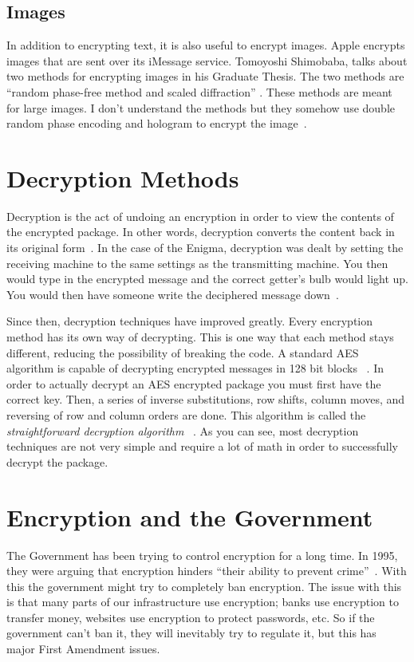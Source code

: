\documentclass[12pt,a4paper,titlepage]{article}
\begin{document}
\subsection{Images}
In addition to encrypting text, it is also useful to encrypt images. Apple 
encrypts images that are sent over its iMessage service. Tomoyoshi Shimobaba, 
talks about two methods for encrypting images in his Graduate Thesis.  The two 
methods are ``random phase-free method and scaled diffraction'' 
\cite{shimobaba2015optical}. These methods are meant for large images. I don't 
understand the methods but they somehow use double random phase encoding and 
hologram to encrypt the image~\cite{shimobaba2015optical}.

\section{Decryption Methods}
Decryption is the act of undoing an encryption in order to view the contents of
the encrypted package. In other words, decryption converts the content back in
its original form~\cite{deshpande2009fpga}. In the case of the Enigma,
decryption was dealt by setting the receiving machine to the same settings as
the transmitting machine. You then would type in the encrypted message and the
correct getter's bulb would light up. You would then have someone write the
deciphered message down~\cite{wilcox2006solving}.

Since then, decryption techniques have improved greatly. Every encryption
method has its own way of decrypting. This is one way that each method stays
different, reducing the possibility of breaking the code. A standard AES
algorithm is capable of decrypting encrypted messages in 128 bit blocks
~\cite{deshpande2009fpga}. In order to actually decrypt an AES encrypted package
you must first have the correct key. Then, a series of inverse substitutions,
row shifts, column moves, and reversing of row and column orders are done. This
algorithm is called the \emph{straightforward decryption algorithm}
~\cite{daemen2013design}. As you can see, most decryption techniques are not
very simple and require a lot of math in order to successfully decrypt the
package.

\section{Encryption and the Government}
The Government has been trying to control encryption for a long time. In 1995, 
they were arguing that encryption hinders ``their ability to prevent 
crime''~\cite{ryan1995freedom}. With this the government might try to completely
ban encryption. The issue with this is that many parts of our infrastructure use
encryption; banks use encryption to transfer money, websites use encryption to 
protect passwords, etc. So if the government can't ban it, they will inevitably 
try to regulate it, but this has major First Amendment issues.
\end{document}
